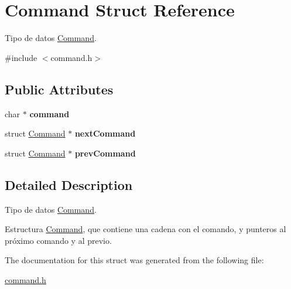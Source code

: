 \hypertarget{structCommand}{\section{Command Struct Reference}
\label{structCommand}
}


Tipo de datos \hyperlink{structCommand}{Command}.  




{\ttfamily \#include $<$command.\-h$>$}

\subsection*{Public Attributes}
\begin{DoxyCompactItemize}
\item 
\hypertarget{structCommand_aa33931974cdda4f3ae6c8cb45fc5de50}{char $\ast$ {\bfseries command}}\label{structCommand_aa33931974cdda4f3ae6c8cb45fc5de50}

\item 
\hypertarget{structCommand_ac0d5b73ebeb1144fb6c9d0c78237644a}{struct \hyperlink{structCommand}{Command} $\ast$ {\bfseries next\-Command}}\label{structCommand_ac0d5b73ebeb1144fb6c9d0c78237644a}

\item 
\hypertarget{structCommand_a6f6d26e92c0a5abccc3ec8f7a7667778}{struct \hyperlink{structCommand}{Command} $\ast$ {\bfseries prev\-Command}}\label{structCommand_a6f6d26e92c0a5abccc3ec8f7a7667778}

\end{DoxyCompactItemize}


\subsection{Detailed Description}
Tipo de datos \hyperlink{structCommand}{Command}. 

Estructura \hyperlink{structCommand}{Command}, que contiene una cadena con el comando, y punteros al próximo comando y al previo. 

The documentation for this struct was generated from the following file\-:\begin{DoxyCompactItemize}
\item 
\hyperlink{command_8h}{command.\-h}\end{DoxyCompactItemize}
